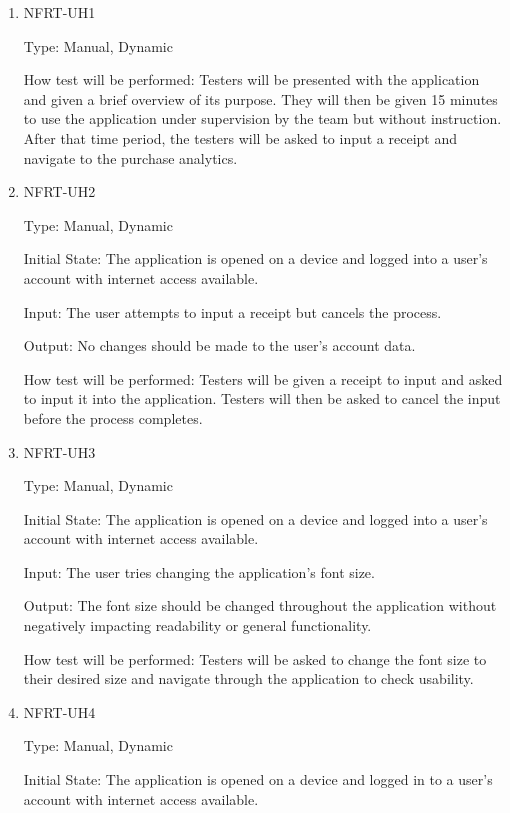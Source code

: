 \documentclass[12pt, titlepage]{article}
\begin{document}
\begin{enumerate}
  \item{NFRT-UH1\\}

  Type: Manual, Dynamic
            
  How test will be performed: Testers will be presented with the
  application and given a brief overview of its purpose. They will then be given 15 minutes to use the application
  under supervision by the team but without instruction. After that time period, the testers will be asked to input
  a receipt and navigate to the purchase analytics.

  \item{NFRT-UH2\\}

  Type: Manual, Dynamic
					
  Initial State: The application is opened on a device and logged into a user's account with internet access available.
					
  Input: The user attempts to input a receipt but cancels the process.
					
  Output: No changes should be made to the user's account data.
  
  How test will be performed: Testers will be given a receipt to input and asked to input it into the application.
  Testers will then be asked to cancel the input before the process completes.

  \item{NFRT-UH3\\}

  Type: Manual, Dynamic
					
  Initial State: The application is opened on a device and logged into a user's account with internet access available.
					
  Input: The user tries changing the application's font size.
					
  Output: The font size should be changed throughout the application without negatively impacting readability
  or general functionality.
  
  How test will be performed: Testers will be asked to change the font size to their desired size and
  navigate through the application to check usability.

  \item{NFRT-UH4\\}

  Type: Manual, Dynamic
					
  Initial State: The application is opened on a device and logged in to a user's account with internet access available.
					

\end{enumerate}
\end{document}
